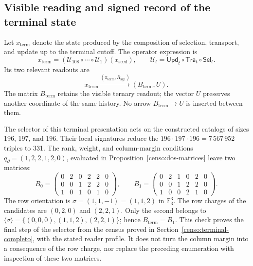 \subsection{Visible reading and signed record of the terminal state}
\label{subsec:k-terminal}

Let \(x_{\mathrm{term}}\) denote the state produced by the composition
of selection, transport, and update up to the terminal cutoff. The
operator expression is
\[
 x_{\mathrm{term}}=
 (\mathcal U_{108}\circ\cdots\circ\mathcal U_1)(x_{\mathrm{seed}}),
 \qquad \mathcal U_t=\mathsf{Upd}_t\circ\mathsf{Tra}_t\circ\mathsf{Sel}_t.
\]
Its two relevant readouts are
\[
 x_{\mathrm{term}}
 \xrightarrow{(\pi_{\mathrm{term}},R_{\mathrm{sgn}})}
 (B_{\mathrm{term}},U).
\]
The matrix \(B_{\mathrm{term}}\) retains the visible ternary readout; the
vector \(U\) preserves another coordinate of the same history. No arrow
\(B_{\mathrm{term}}\to U\) is inserted between them.

The selector of this terminal presentation acts on the constructed catalogs
of sizes 196, 197, and 196. Their local signatures reduce the
\(196\cdot197\cdot196=7\,567\,952\) triples to 331. The rank,
weight, and column-margin conditions \(q_{\partial}=(1,2,2,1,2,0)\), evaluated in
Proposition~\ref{censo:dos-matrices} leave two matrices:
\[
 B_0=\begin{pmatrix}0&2&0&2&2&0\\0&0&1&2&2&0\\1&0&1&0&1&0\end{pmatrix},
 \qquad
 B_1=\begin{pmatrix}0&2&1&0&2&0\\0&0&1&2&2&0\\1&0&0&2&1&0\end{pmatrix}.
\]
The row orientation is \(\sigma=(1,1,-1)=(1,1,2)\) in
\(\mathbb F_3^3\). The row charges of the candidates are
\((0,2,0)\) and \((2,2,1)\). Only the second belongs to
\(\langle\sigma\rangle=\{(0,0,0),(1,1,2),(2,2,1)\}\); hence
\(B_{\mathrm{term}}=B_1\). This check proves the final step of the
selector from the census proved in Section~\ref{censo:terminal-completo},
with the stated reader profile. It does not turn the column margin
into a consequence of the row charge, nor replace the preceding enumeration
with inspection of these two matrices.

